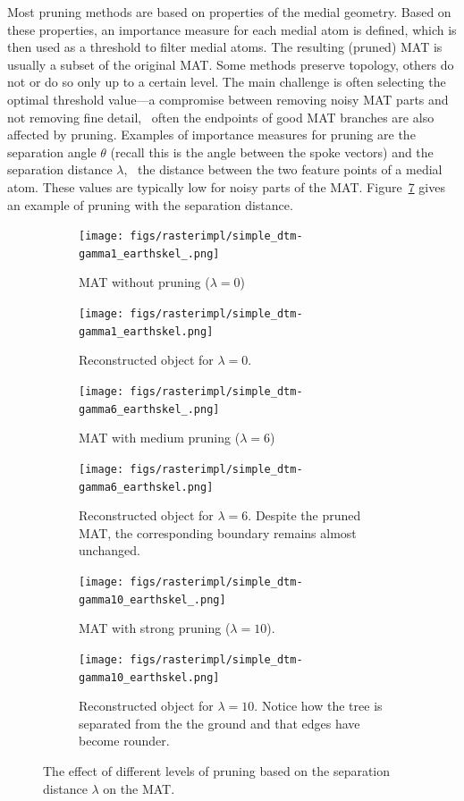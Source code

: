 Most pruning methods are based on properties of the medial geometry. 
Based on these properties, an importance measure for each medial atom is defined, which is then used as a threshold to filter medial atoms. 
The resulting (pruned) MAT is usually a subset of the original MAT. 
Some methods preserve topology, others do not or do so only up to a certain level. 
The main challenge is often selecting the optimal threshold value---a compromise between removing noisy MAT parts and not removing fine detail, \ie\ often the endpoints of good MAT branches are also affected by pruning.
Examples of importance measures for pruning are the separation angle $\theta$ (recall this is the angle between the spoke vectors) and the separation distance $\lambda$, \ie\ the distance between the two feature points of a medial atom. 
These values are typically low for noisy parts of the MAT.
Figure~\ref{fig:imaimp} gives an example of pruning with the separation distance.
\begin{figure}
	\centering
	\begin{subfigure}{0.4\linewidth}
		\texttt{[image: figs/rasterimpl/simple\_dtm-gamma1\_earthskel\_.png]}
		\caption{MAT without pruning ($\lambda=0$)}
		\label{fig:imaimp:a}
	\end{subfigure}
	\quad
	\begin{subfigure}{0.4\linewidth}
		\texttt{[image: figs/rasterimpl/simple\_dtm-gamma1\_earthskel.png]}
		\caption{Reconstructed object for $\lambda=0$.}
		\label{fig:imaimp:b}
	\end{subfigure}
	
	\begin{subfigure}{0.4\linewidth}
		\texttt{[image: figs/rasterimpl/simple\_dtm-gamma6\_earthskel\_.png]}
		\caption{MAT with medium pruning ($\lambda=6$)}
		\label{fig:imaimp:c}
	\end{subfigure}
	\quad
	\begin{subfigure}{0.4\linewidth}
		\texttt{[image: figs/rasterimpl/simple\_dtm-gamma6\_earthskel.png]}
		\caption{Reconstructed object for $\lambda=6$. Despite the pruned MAT, the corresponding boundary remains almost unchanged.}
		\label{fig:imaimp:d}
	\end{subfigure}
	
	\begin{subfigure}{0.4\linewidth}
		\texttt{[image: figs/rasterimpl/simple\_dtm-gamma10\_earthskel\_.png]}
		\caption{MAT with strong pruning ($\lambda=10$).}
		\label{fig:imaimp:e}
	\end{subfigure}
	\quad
	\begin{subfigure}{0.4\linewidth}
		\texttt{[image: figs/rasterimpl/simple\_dtm-gamma10\_earthskel.png]}
		\caption{Reconstructed object for $\lambda=10$. Notice how the tree is separated from the the ground and that edges have become rounder.}
		\label{fig:imaimp:f}
	\end{subfigure}
	\caption[The effect of different levels of pruning]{The effect of different levels of pruning based on the separation distance $\lambda$ on the MAT.}
	\label{fig:imaimp}
\end{figure}

